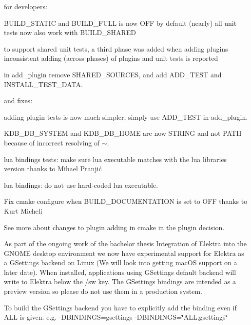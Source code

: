 for developers\+:


\begin{DoxyItemize}
\item B\+U\+I\+L\+D\+\_\+\+S\+T\+A\+T\+IC and B\+U\+I\+L\+D\+\_\+\+F\+U\+LL is now O\+FF by default (nearly) all unit tests now also work with B\+U\+I\+L\+D\+\_\+\+S\+H\+A\+R\+ED
\item to support shared unit tests, a third phase was added when adding plugins inconsistent adding (across phases) of plugins and unit tests is reported
\item in {\ttfamily add\+\_\+plugin} remove S\+H\+A\+R\+E\+D\+\_\+\+S\+O\+U\+R\+C\+ES, and add {\ttfamily A\+D\+D\+\_\+\+T\+E\+ST} and {\ttfamily I\+N\+S\+T\+A\+L\+L\+\_\+\+T\+E\+S\+T\+\_\+\+D\+A\+TA}.
\end{DoxyItemize}

and fixes\+:


\begin{DoxyItemize}
\item adding plugin tests is now much simpler, simply use {\ttfamily A\+D\+D\+\_\+\+T\+E\+ST} in {\ttfamily add\+\_\+plugin}.
\item K\+D\+B\+\_\+\+D\+B\+\_\+\+S\+Y\+S\+T\+EM and K\+D\+B\+\_\+\+D\+B\+\_\+\+H\+O\+ME are now S\+T\+R\+I\+NG and not P\+A\+TH because of incorrect resolving of {\ttfamily $\sim$}.
\item lua bindings tests\+: make sure lua executable matches with the lua libraries version thanks to Mihael Pranjić
\item lua bindings\+: do not use hard-\/coded {\ttfamily lua} executable.
\item Fix cmake configure when B\+U\+I\+L\+D\+\_\+\+D\+O\+C\+U\+M\+E\+N\+T\+A\+T\+I\+ON is set to O\+FF thanks to Kurt Micheli
\end{DoxyItemize}

See more about changes to plugin adding in cmake in the plugin decision.

As part of the ongoing work of the bachelor thesis {\ttfamily Integration of Elektra into the G\+N\+O\+ME desktop environment} we now have experimental support for Elektra as a G\+Settings backend on Linux (We will look into getting mac\+OS support on a later date). When installed, applications using G\+Settings default backend will write to Elektra below the {\ttfamily /sw} key. The G\+Settings bindings are intended as a preview version so please do not use them in a production system.

To build the G\+Settings backend you have to explicitly add the binding even if {\ttfamily A\+LL} is given. e.\+g. {\ttfamily -\/D\+B\+I\+N\+D\+I\+N\+GS=gsettings} {\ttfamily -\/D\+B\+I\+N\+D\+I\+N\+GS=\char`\"{}\+A\+L\+L;gsettings\char`\"{}}

